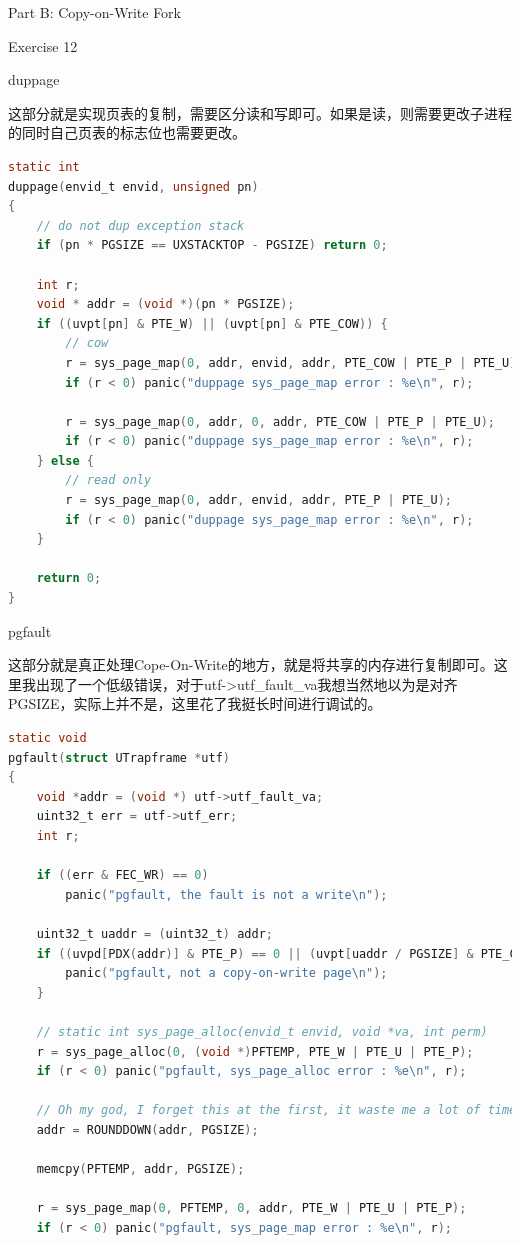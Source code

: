 \documentclass[GBK,winfonts,a4paper,10pt]{ctexart}
\begin{document}
\begin{section}{Part B: Copy-on-Write Fork}
\begin{subsection}{ Exercise 12 }
\begin{subsubsection}{ duppage }
\par
这部分就是实现页表的复制，需要区分读和写即可。如果是读，则需要更改子进程的同时自己页表的标志位也需要更改。
\begin{lstlisting}[language = C]
static int
duppage(envid_t envid, unsigned pn)
{
	// do not dup exception stack
	if (pn * PGSIZE == UXSTACKTOP - PGSIZE) return 0;

	int r;
	void * addr = (void *)(pn * PGSIZE);
	if ((uvpt[pn] & PTE_W) || (uvpt[pn] & PTE_COW)) {
		// cow
		r = sys_page_map(0, addr, envid, addr, PTE_COW | PTE_P | PTE_U);
		if (r < 0) panic("duppage sys_page_map error : %e\n", r);
		
		r = sys_page_map(0, addr, 0, addr, PTE_COW | PTE_P | PTE_U);
		if (r < 0) panic("duppage sys_page_map error : %e\n", r);
	} else {
		// read only
		r = sys_page_map(0, addr, envid, addr, PTE_P | PTE_U);
		if (r < 0) panic("duppage sys_page_map error : %e\n", r);
	}

	return 0;
}
\end{lstlisting}
\end{subsubsection}


\begin{subsubsection}{ pgfault }
\par
这部分就是真正处理Cope-On-Write的地方，就是将共享的内存进行复制即可。这里我出现了一个低级错误，对于utf->utf\_fault\_va我想当然地以为是对齐PGSIZE，实际上并不是，这里花了我挺长时间进行调试的。
\begin{lstlisting}[language = C]
static void
pgfault(struct UTrapframe *utf)
{
	void *addr = (void *) utf->utf_fault_va;
	uint32_t err = utf->utf_err;
	int r;

	if ((err & FEC_WR) == 0)
		panic("pgfault, the fault is not a write\n");

	uint32_t uaddr = (uint32_t) addr;
	if ((uvpd[PDX(addr)] & PTE_P) == 0 || (uvpt[uaddr / PGSIZE] & PTE_COW) == 0) {
		panic("pgfault, not a copy-on-write page\n");
	}

	// static int sys_page_alloc(envid_t envid, void *va, int perm)
	r = sys_page_alloc(0, (void *)PFTEMP, PTE_W | PTE_U | PTE_P);
	if (r < 0) panic("pgfault, sys_page_alloc error : %e\n", r);

	// Oh my god, I forget this at the first, it waste me a lot of time to debug!!!
	addr = ROUNDDOWN(addr, PGSIZE);
	
	memcpy(PFTEMP, addr, PGSIZE);
	
	r = sys_page_map(0, PFTEMP, 0, addr, PTE_W | PTE_U | PTE_P);
	if (r < 0) panic("pgfault, sys_page_map error : %e\n", r);


\end{lstlisting}
\end{subsubsection}
\end{subsection}
\end{section}
\end{document}

